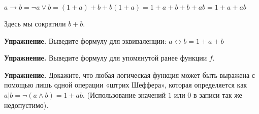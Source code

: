 $a \rightarrow b = \neg a \vee b = (1 + a) + b + b(1 + a) = 1 + a + b + b + ab = 1 + a + ab$

Здесь мы сократили $b+b$.

{\bfseries Упражнение.} Выведите формулу для эквиваленции: $a \leftrightarrow b = 1 + a + b$

{\bfseries Упражнение.} Выведите формулу для упомянутой ранее функции $f$.

{\bfseries Упражнение.} Докажите, что любая логическая функция может быть выражена с помощью лишь одной операции «штрих Шеффера», которая определяется как $a|b = \neg(a\wedge b) = 1 + ab$. (Использование значений $1$ или $0$ в записи так же недопустимо).
